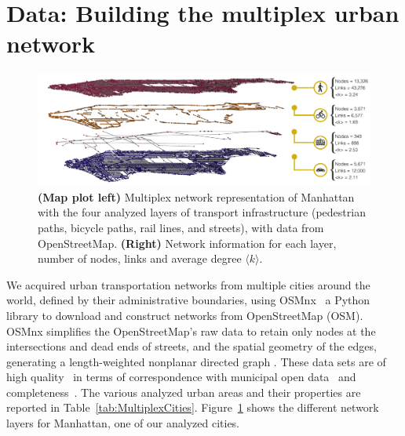 \section{Data: Building the multiplex urban network}\label{sec:overlapData}

\begin{figure}[t!]
	\centering
	\includegraphics[width=\textwidth]{images/multiplex/Multilayer_NY_op2.png}
	\caption[Manhattan multiplex network]{\textbf{(Map plot left)} Multiplex network representation of Manhattan with the four analyzed layers of transport infrastructure (pedestrian paths, bicycle paths, rail lines, and streets), with data from OpenStreetMap. \textbf{(Right)} Network information for each layer, number of nodes, links and average degree $\langle k \rangle$.}
	\label{fig:ManhattanMultiplex}
\end{figure}


We acquired urban transportation networks from multiple cities around the world, defined by their administrative boundaries, using OSMnx~\cite{boeing2017osmnx} a Python library to download and construct networks from OpenStreetMap (OSM). OSMnx simplifies the OpenStreetMap's raw data to retain only nodes at the intersections and dead ends of streets, and the spatial geometry of the edges, generating a length-weighted nonplanar directed graph \cite{Boeing2020Planarity}. These data sets are of high quality~\cite{haklay2010openstreetmap,girres2010quality} in terms of correspondence with municipal open data~\cite{Ferster2019Bicycle} and completeness~\cite{barbosa2018human}. The various analyzed urban areas and their properties are reported in Table~\ref{tab:MultiplexCities}. Figure~\ref{fig:ManhattanMultiplex} shows the different network layers for Manhattan, one  of our analyzed cities.

